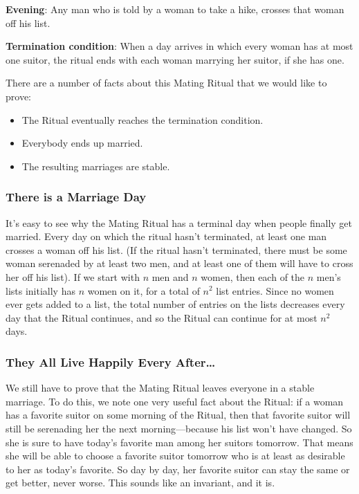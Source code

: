 \textbf{Evening}: Any man who is told by a woman to take a hike,
crosses that woman off his list.

\textbf{Termination condition}: When a day arrives in which every
woman has at most one suitor, the ritual ends with each woman marrying
her suitor, if she has one.


There are a number of facts about this Mating Ritual that we would like to
prove:

\begin{itemize}
\item The Ritual eventually reaches the termination condition.
\item Everybody ends up married.
\item The resulting marriages are stable.
\end{itemize}


\subsubsection{There is a Marriage Day}

It's easy to see why the Mating Ritual has a terminal day when people
finally get married.  Every day on which the ritual hasn't terminated, at
least one man crosses a woman off his list.  (If the ritual hasn't
terminated, there must be some woman serenaded by at least two men, and at
least one of them will have to cross her off his list).  If we start with
$n$ men and $n$ women, then each of the $n$ men's lists initially has $n$
women on it, for a total of $n^2$ list entries.  Since no women ever gets
added to a list, the total number of entries on the lists decreases every
day that the Ritual continues, and so the Ritual can continue for at most
$n^2$ days.

\subsubsection{They All Live Happily Every After\dots}

We still have to prove that the Mating Ritual leaves everyone in a
stable marriage.  To do this, we note one very useful fact about the
Ritual: if a woman has a favorite suitor on some morning of the
Ritual, then that favorite suitor will still be serenading her the
next morning---because his list won't have changed.  So she is sure to
have today's favorite man among her suitors tomorrow.  That means she
will be able to choose a favorite suitor tomorrow who is at least as
desirable to her as today's favorite.  So day by day, her favorite
suitor can stay the same or get better, never worse.  This sounds like
an invariant, and it is.

